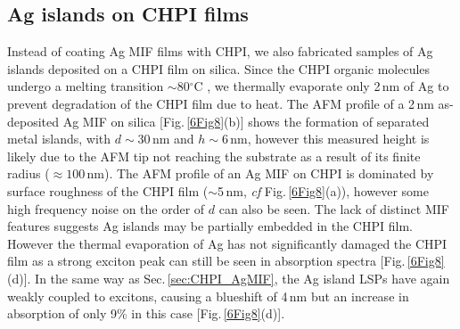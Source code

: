 \subsection{Ag islands on CHPI films}
\label{sec:AgonCHPI}

Instead of coating Ag MIF films with CHPI, we also fabricated samples of Ag islands deposited on a CHPI film on silica. Since the CHPI organic molecules undergo a melting transition $\sim$80$^{\circ}$C \cite{Barman2003}, we thermally evaporate only 2\,nm of Ag to prevent degradation of the CHPI film due to heat. The AFM profile of a 2\,nm as-deposited Ag MIF on silica [Fig.\,\ref{6Fig8}(b)] shows the formation of separated metal islands, with $d\sim30$\,nm and $h\sim6$\,nm, %
however this measured height is likely due to the AFM tip not reaching the substrate as a result of its finite radius ($\approx 100$\,nm). %
The AFM profile of an Ag MIF on CHPI is dominated by surface roughness of the CHPI film ($\sim$5\,nm, \textit{cf} Fig.\,\ref{6Fig8}(a)), however some high frequency noise on the order of $d$ can also be seen. The lack of distinct MIF features suggests Ag islands may be partially embedded in the CHPI film. However the thermal evaporation of Ag has not significantly damaged the CHPI film as a strong exciton peak can still be seen in absorption spectra [Fig.\,\ref{6Fig8}(d)]. In the same way as Sec.\,\ref{sec:CHPI_AgMIF}, the Ag island LSPs have again weakly coupled to excitons, causing a blueshift of 4\,nm but an increase in absorption of only 9\% in this case [Fig.\,\ref{6Fig8}(d)].
